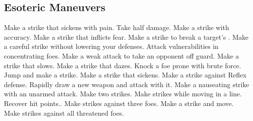 
\small
\subsection{Esoteric Maneuvers}\label{Esoteric Maneuvers}
\begin{spelllist}
 Make a strike that sickens with pain.
 Take half damage.
 Make a strike with  accuracy.
 Make a strike that inflicts fear.
 Make a strike to break a target's .
 Make a careful strike without lowering your defenses.
 Attack vulnerabilities in concentrating foes.
 Make a weak attack to take an opponent off guard.
 Make a strike that slows.
 Make a strike that dazes.
 Knock a foe prone with brute force.
 Jump and make a strike.
 Make a strike that sickens.
 Make a strike against Reflex defense.
 Rapidly draw a new weapon and attack with it.
 Make a nauseating strike with an unarmed attack.
 Make two strikes.
 Make strikes while moving in a line.
 Recover hit points..
 Make strikes against three foes.
 Make a strike and move.
 Make strikes against all threatened foes.
\end{spelllist}



\small
